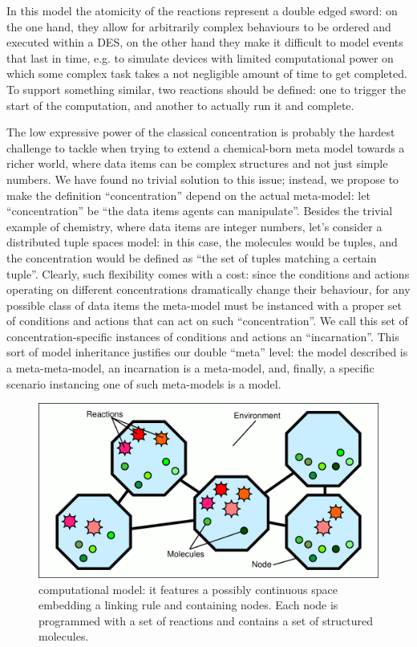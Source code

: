 \documentclass[12pt,a4paper,twoside,openright]{book}
\begin{document}
In this model the atomicity of the reactions represent a double edged sword: on the one hand, they allow for arbitrarily complex behaviours to be ordered and executed within a DES, on the other hand they make it difficult to model events that last in time, e.g. to simulate devices with limited computational power on which some complex task takes a not negligible amount of time to get completed.
%
To support something similar, two reactions should be defined: one to trigger the start of the computation, and another to actually run it and complete.

The low expressive power of the classical concentration is probably the hardest challenge to tackle when trying to extend a chemical-born meta model towards a richer world, where data items can be complex structures and not just simple numbers.
%
We have found no trivial solution to this issue; instead, we propose to make the definition ``concentration'' depend on the actual meta-model: let ``concentration'' be ``the data items agents can manipulate''.
%
Besides the trivial example of chemistry, where data items are integer numbers, let's consider a distributed tuple spaces model: in this case, the molecules would be tuples, and the concentration would be defined as ``the set of tuples matching a certain tuple''.
%
Clearly, such flexibility comes with a cost: since the conditions and actions operating on different concentrations dramatically change their behaviour, for any possible class of data items the meta-model must be instanced with a proper set of conditions and actions that can act on such ``concentration''.
%
We call this set of concentration-specific instances of conditions and actions an ``incarnation''.
%
This sort of model inheritance justifies our double ``meta'' level: the model described is a meta-meta-model, an incarnation is a meta-model, and, finally, a specific scenario instancing one of such meta-models is a model.

\label{model}
\begin{figure}%
  \begin{center}
    \includegraphics[width=0.99\columnwidth]{img/model.pdf}
    \caption{\alchemist{} computational model: it features a possibly continuous space embedding a linking rule and containing nodes. Each node is programmed with a set of reactions and contains a set of structured molecules.}
    \label{img:model}
  \end{center}
\end{figure}
\end{document}

